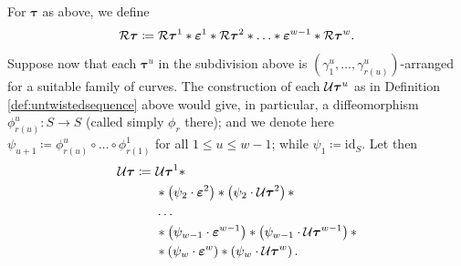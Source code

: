 \begin{defin}\label{def:not_firmly}
For $\bm\tau$ as above, we define
$$
{\mathcal R}\bm\tau\coloneqq {\mathcal R}\bm\tau^1*\bm{\varepsilon}^1*{\mathcal R}\bm\tau^2*\ldots*\bm{\varepsilon}^{w-1}*{\mathcal R}\bm\tau^w.
$$

Suppose now that each $\bm\tau^u$ in the subdivision above is $(\gamma_1^u,\ldots,\gamma_{r(u)}^u)$-arranged for a suitable family of curves. The construction of each ${\mathcal U}\bm\tau^u$ as in Definition \ref{def:untwistedsequence} above would give, in particular, a diffeomorphism $\phi_{r(u)}^u:S\rightarrow S$ (called simply $\phi_r$ there); and we denote here $\psi_{u+1}\coloneqq \phi_{r(u)}^u\circ\ldots\circ \phi_{r(1)}^1$ for all $1\leq u \leq w-1$; while $\psi_1\coloneqq \mathrm{id}_S$. Let then
\begin{align*}
{\mathcal U}\bm\tau \coloneqq\  & {\mathcal U}\bm\tau^1*\\
 &  * \left(\psi_2\cdot \bm{\varepsilon}^2\right) * \left(\psi_2\cdot{\mathcal U}\bm\tau^2\right) *\\
 & \ldots  \\
 & * \left(\psi_{w-1}\cdot \bm{\varepsilon}^{w-1}\right) * \left(\psi_{w-1}\cdot{\mathcal U}\bm\tau^{w-1}\right) * \\
 & * \left(\psi_w \cdot \bm{\varepsilon}^w\right) * \left(\psi_w\cdot{\mathcal U}\bm\tau^w\right).
\end{align*}
\end{defin}

